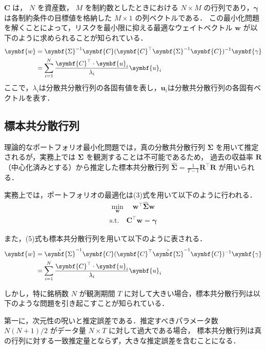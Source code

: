 \documentclass[lualatex,a4paper,11pt]{jlreq}
\begin{document}
$\symbf{C}$ は， $N$ を資産数， $M$ を制約数としたときにおける $N \times M$ の行列であり，$\symbf{\gamma}$ は各制約条件の目標値を格納した $M \times 1$ の列ベクトルである．
この最小化問題を解くことによって，リスクを最小限に抑える最適なウェイトベクトル $\symbf{w}$ が以下のように求められることが知られている．
\begin{align}
  \symbf{w} &= \symbf{\Sigma}^{-1} \symbf{C} (\symbf{C}^\top \symbf{\Sigma}^{-1} \symbf{C})^{-1} \symbf{\gamma} \\ \notag
             &= \sum_{i=1}^{N} \frac{\symbf{C}^\top \cdot \symbf{u}_i}{\lambda_i} \symbf{u}_i
\end{align}
ここで，$\lambda_i$は分散共分散行列の各固有値を表し，$\symbf{u}_i$は分散共分散行列の各固有ベクトルを表す．

\subsection{標本共分散行列}

理論的なポートフォリオ最小化問題では，真の分散共分散行列 $\symbf{\Sigma}$ を用いて推定されるが，実務上では $\symbf{\Sigma}$ を観測することは不可能であるため，
過去の収益率 $\symbf{R}$ （中心化済みとする）から推定した標本共分散行列 $\symbf{\hat{\Sigma}} = \frac{1}{T-1} \symbf{R}^\top \symbf{R}$ が用いられる．

実務上では，ポートフォリオの最適化は(3)式を用いて以下のように行われる．
\begin{align}
  \min_{\symbf{w}} \quad \symbf{w}^\top \hat{\symbf{\Sigma}} \symbf{w}
  \\[1em]
  \text{s.t.} \quad \symbf{C}^\top\symbf{w} = \symbf{\gamma}
\end{align}

また，(5)式も標本共分散行列を用いて以下のように表される．
\begin{align}
  \symbf{w} &= \hat{\symbf{\Sigma}}^{-1} \symbf{C} (\symbf{C}^\top \hat{\symbf{\Sigma}}^{-1} \symbf{C})^{-1} \symbf{\gamma} \\ \notag
             &= \sum_{i=1}^{N} \frac{\symbf{C}^\top \cdot \symbf{u}_i}{\lambda_i} \symbf{u}_i
\end{align}

しかし，特に銘柄数 $N$ が観測期間 $T$ に対して大きい場合，標本共分散行列は以下のような問題を引き起こすことが知られている．

第一に，次元性の呪いと推定誤差である．推定すべきパラメータ数 $N(N+1)/2$ がデータ量 $N \times T$ に対して過大である場合，
標本共分散行列は真の行列に対する一致推定量とならず，大きな推定誤差を含むことになる．
\end{document}
